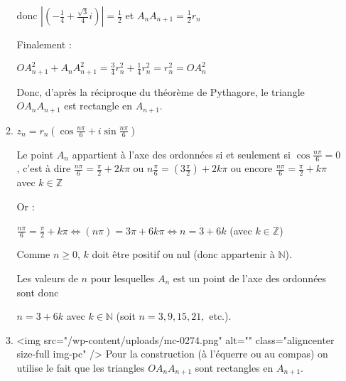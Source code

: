 \begin{corrige}
\begin{enumerate}
\begin{enumerate}[label=\alph*.]
               donc $\left| \left(-\frac{1}{4} + \frac{\sqrt{3}}{4}i\right) \right| = \frac{1}{2}$ et $A_{n}A_{n+1}=\frac{1}{2}r_{n}$
               \par
               Finalement :
               \par
               $ OA_{n+1}^{2} + A_{n}A_{n+1}^{2} = \frac{3}{4}r_{n}^{2}+\frac{1}{4}r_{n}^{2} = r_{n}^{2} = OA_{n}^{2}$
               \par
               Donc, d'après la réciproque du théorème de Pythagore, le triangle $OA_{n}A_{n+1}$ est rectangle en $A_{n+1}$.
               \item
               $z_{n}=r_{n} \left(\cos\frac{n\pi }{6}+i \sin\frac{n\pi }{6}\right)$
               \par
               Le point $A_{n}$ appartient à l'axe des ordonnées si et seulement si $\cos\frac{n\pi }{6} = 0$, c'est à dire $\frac{n\pi }{6}=\frac{\pi }{2}+2k\pi $ ou $n\frac{\pi }{6}=\left(3\frac{\pi }{2}\right)+2k\pi $ ou encore $\frac{n\pi }{6}=\frac{\pi }{2} + k\pi $ avec $k \in  \mathbb{Z}$
               \par
               Or :
               \par
               $\frac{n\pi }{6}=\frac{\pi }{2} + k\pi   \Leftrightarrow  \left(n\pi \right)=3\pi  + 6k\pi    \Leftrightarrow  n= 3 + 6k$  (avec $k \in  \mathbb{Z}$)
               \par
               Comme $n\geqslant 0$, $k$ doit être positif ou nul (donc appartenir à $\mathbb{N}$).
               \par
               Les valeurs de $n$  pour lesquelles $A_{n}$ est un point de l'axe des ordonnées sont donc
               \par
               $n= 3 + 6k$  avec $k \in  \mathbb{N}$ (soit $n = 3, 9, 15, 21,$ etc.).
               \item

\begin{center}
\end{center}
               <img src="/wp-content/uploads/mc-0274.png" alt="" class="aligncenter size-full  img-pc" />
               Pour la construction (à l'équerre ou au compas) on utilise le fait que les triangles $OA_{n}A_{n+1}$ sont rectangles en $A_{n+1}$.
          \end{enumerate}
     \end{enumerate}
\end{corrige}
